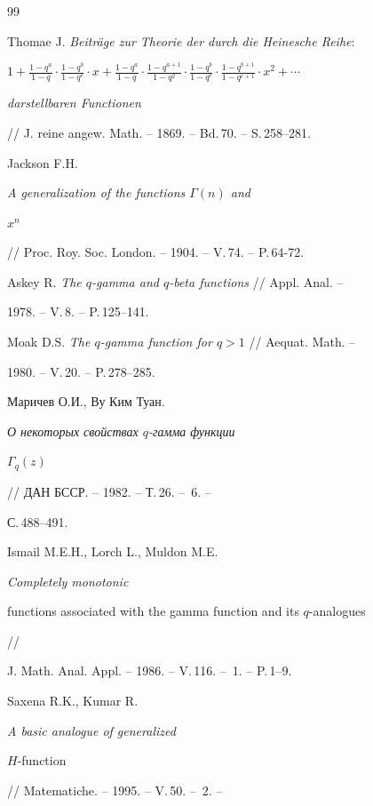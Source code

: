  


 


\begin{thebibliography}{99} 


 




Thomae J. {\em Beitr\"age zur Theorie der durch die Heinesche Reihe}: 


$1+\frac{1-q^a}{1-q}\cdot \frac{1-q^b}{1-q^c}\cdot 


x+\frac{1-q^a}{1-q}\cdot \frac{1-q^{a+1}}{1-q^2}\cdot 


\frac{1-q^b}{1-q^c}\cdot \frac{1-q^{b+1}}{1-q^{c+1}}\cdot x^2+\dotsb$ 


{\em darstellbaren Functionen}


// J. reine angew. Math. -- 1869. -- Bd.\,70. -- S.\,258--281. 




Jackson F.H. {\em A generalization of the functions $\Gamma(n)$ and 


$x^n$} // Proc. Roy. Soc. London. -- 1904. -- V.\,74. -- P.\,64-72. 




Askey R. {\em The $q$-gamma and $q$-beta functions} // Appl. Anal. -- 


1978. -- V.\,8. -- P.\,125--141. 




Moak D.S. {\em The $q$-gamma function for $q>1$} // Aequat. Math. -- 


1980. -- V.\,20. -- P.\,278--285. 




Маричев О.И., Ву Ким Туан. {\em О некоторых свойствах $q$-гамма функции 


$\Gamma_q(z)$} // ДАН БССР. -- 1982. -- Т.\,26. -- \No\,6. -- 


С.\,488--491. 




Ismail M.E.H., Lorch L., Muldon M.E. {\em Completely monotonic 


functions associated with the gamma function and its $q$-analogues} // 


J. Math. Anal. Appl. -- 1986. -- V.\,116. -- \No\,1. -- P.\,1--9. 




Saxena R.K., Kumar R. {\em A basic analogue of generalized 


$H$-function} // Matematiche. -- 1995. -- V.\,50. -- \No\,2. -- 



\end{thebibliography}
